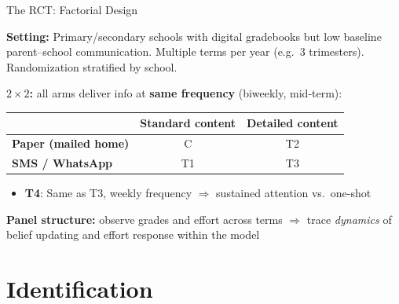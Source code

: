 \documentclass[aspectratio=169,11pt]{beamer}
\begin{document}
\begin{frame}{The RCT:  Factorial Design}

\textbf{Setting:} Primary/secondary schools with digital gradebooks but low baseline parent--school communication. Multiple terms per year (e.g.\ 3 trimesters). Randomization stratified by school.

\bigskip

\textbf{$2 \times 2$:} all arms deliver info at \textbf{same frequency} (biweekly, mid-term):

\begin{table}[h]
\centering
\small
\begin{tabular}{@{}lcc@{}}
\toprule
 & \textbf{Standard content} & \textbf{Detailed content} \\
\midrule
\textbf{Paper (mailed home)} & C & T2 \\
\textbf{SMS / WhatsApp}      & T1 & T3 \\
\bottomrule
\end{tabular}
\end{table}

\begin{itemize}
    \item \textbf{T4}: Same as T3, weekly frequency $\Rightarrow$ sustained attention vs.\ one-shot
\end{itemize}

\bigskip

\textbf{Panel structure:} observe grades and effort across terms $\Rightarrow$ trace \emph{dynamics} of belief updating and effort response within the model

\end{frame}

\section{Identification}
\end{document}
